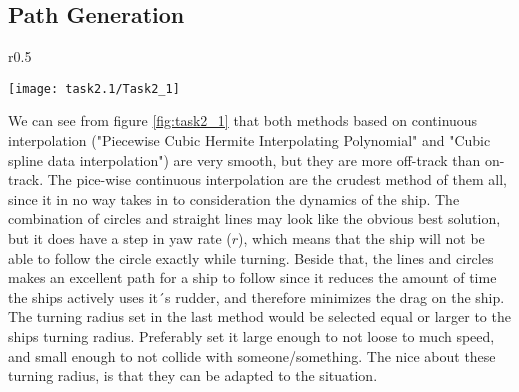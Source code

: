 \subsection{Path Generation}\label{subsec:prob2.1}
\begin{wrapfigure}{r}{0.5 \textwidth}
    \begin{center}
     \texttt{[image: task2.1/Task2\_1]}
     \end{center}
    \caption{Different trajectories}
    \label{fig:task2_1}
\end{wrapfigure}
We can see from figure \ref{fig:task2_1} that both methods based on continuous interpolation ("Piecewise Cubic Hermite Interpolating Polynomial" and "Cubic spline data interpolation") are very smooth, but they are more off-track than on-track. The pice-wise continuous interpolation are the crudest method of them all, since it in no way takes in to consideration the dynamics of the ship. The combination of circles and straight lines may look like the obvious best solution, but it does have a step in yaw rate ($r$), which means that the ship will not be able to follow the circle exactly while turning. Beside that, the lines and circles makes an excellent path for a ship to follow since it reduces the amount of time the ships actively uses it´s rudder, and therefore minimizes the drag on the ship. The turning radius set in the last method would be selected equal or larger to the ships turning radius. Preferably set it large enough to not loose to much speed, and small enough to not collide with someone/something. The nice about these turning radius, is that they can be adapted to the situation.

